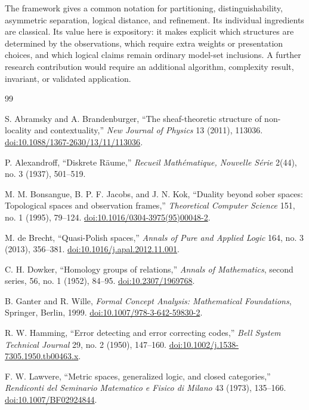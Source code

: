 \documentclass[11pt]{article}
\theoremstyle{definition}
\theoremstyle{plain}
\theoremstyle{remark}
\begin{document}
The framework gives a common notation for partitioning, distinguishability,
asymmetric separation, logical distance, and refinement.  Its individual
ingredients are classical.  Its value here is expository: it makes explicit
which structures are determined by the observations, which require extra
weights or presentation choices, and which logical claims remain ordinary
model-set inclusions.  A further research contribution would require an
additional algorithm, complexity result, invariant, or validated application.

\begin{thebibliography}{99}
\small

S. Abramsky and A. Brandenburger,
``The sheaf-theoretic structure of non-locality and contextuality,''
\emph{New Journal of Physics} 13 (2011), 113036.
\href{https://doi.org/10.1088/1367-2630/13/11/113036}
{doi:10.1088/1367-2630/13/11/113036}.

P. Alexandroff,
``Diskrete R\"aume,''
\emph{Recueil Math\'ematique, Nouvelle S\'erie} 2(44), no. 3 (1937),
501--519.

M. M. Bonsangue, B. P. F. Jacobs, and J. N. Kok,
``Duality beyond sober spaces: Topological spaces and observation frames,''
\emph{Theoretical Computer Science} 151, no. 1 (1995), 79--124.
\href{https://doi.org/10.1016/0304-3975(95)00048-2}
{doi:10.1016/0304-3975(95)00048-2}.

M. de Brecht,
``Quasi-Polish spaces,''
\emph{Annals of Pure and Applied Logic} 164, no. 3 (2013), 356--381.
\href{https://doi.org/10.1016/j.apal.2012.11.001}
{doi:10.1016/j.apal.2012.11.001}.

C. H. Dowker,
``Homology groups of relations,''
\emph{Annals of Mathematics}, second series, 56, no. 1 (1952), 84--95.
\href{https://doi.org/10.2307/1969768}{doi:10.2307/1969768}.

B. Ganter and R. Wille,
\emph{Formal Concept Analysis: Mathematical Foundations},
Springer, Berlin, 1999.
\href{https://doi.org/10.1007/978-3-642-59830-2}
{doi:10.1007/978-3-642-59830-2}.

R. W. Hamming,
``Error detecting and error correcting codes,''
\emph{Bell System Technical Journal} 29, no. 2 (1950), 147--160.
\href{https://doi.org/10.1002/j.1538-7305.1950.tb00463.x}
{doi:10.1002/j.1538-7305.1950.tb00463.x}.

F. W. Lawvere,
``Metric spaces, generalized logic, and closed categories,''
\emph{Rendiconti del Seminario Matematico e Fisico di Milano} 43 (1973),
135--166.
\href{https://doi.org/10.1007/BF02924844}{doi:10.1007/BF02924844}.


\end{thebibliography}
\end{document}
